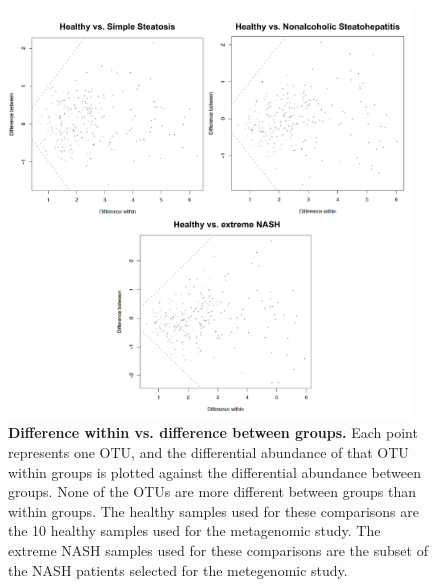 \begin{figure}[h]
\begin{center}
\includegraphics[width=0.95\textwidth]{nafld_16s_aldex.png}
\caption{\textbf{Difference within vs. difference between groups.} Each point represents one OTU, and the differential abundance of that OTU within groups is plotted against the differential abundance between groups. None of the OTUs are more different between groups than within groups. The healthy samples used for these comparisons are the 10 healthy samples used for the metagenomic study. The extreme NASH samples used for these comparisons are the subset of the NASH patients selected for the metegenomic study.}
\end{center}
\label{nafld_fig3}
\end{figure}

